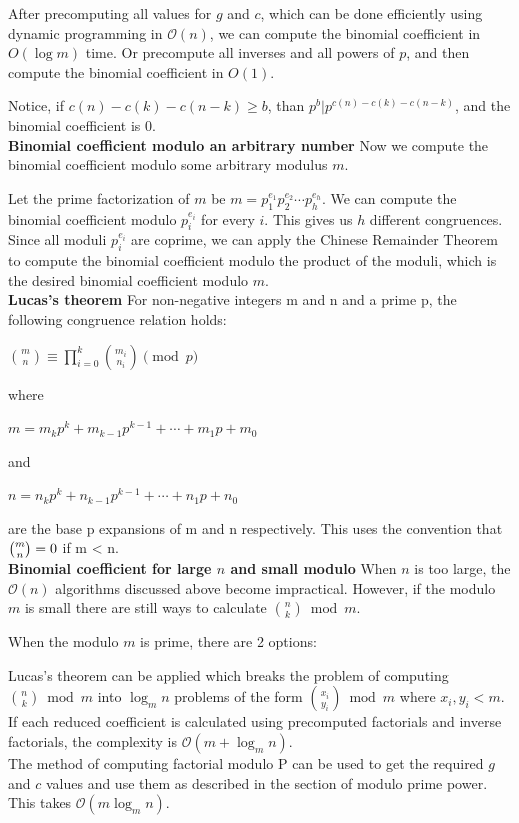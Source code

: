 \documentclass[8pt, a4paper, oneside, twocolumn]{extarticle}
\begin{document}
After precomputing all values for $g$ and $c$, which can be done efficiently using dynamic programming in $\mathcal{O}(n)$, we can compute the binomial coefficient in $O(\log m)$ time. Or precompute all inverses and all powers of $p$, and then compute the binomial coefficient in $O(1)$.

Notice, if $c(n) - c(k) - c(n-k) \ge b$, than $p^b | p^{c(n) - c(k) - c(n-k)}$, and the binomial coefficient is $0$.
\\\textbf{Binomial coefficient modulo an arbitrary number}
Now we compute the binomial coefficient modulo some arbitrary modulus $m$.

Let the prime factorization of $m$ be $m = p_1^{e_1} p_2^{e_2} \cdots p_h^{e_h}$. We can compute the binomial coefficient modulo $p_i^{e_i}$ for every $i$. This gives us $h$ different congruences. Since all moduli $p_i^{e_i}$ are coprime, we can apply the Chinese Remainder Theorem to compute the binomial coefficient modulo the product of the moduli, which is the desired binomial coefficient modulo $m$.
\\%
\textbf{Lucas's theorem}
For non-negative integers m and n and a prime p, the following congruence relation holds:

    ${\binom {m}{n}}\equiv \prod _{i=0}^{k}{\binom {m_{i}}{n_{i}}}{\pmod {p}}$

where

    $m=m_{k}p^{k}+m_{k-1}p^{k-1}+\cdots +m_{1}p+m_{0}$

and

    $n=n_{k}p^{k}+n_{k-1}p^{k-1}+\cdots +n_{1}p+n_{0}$ 

are the base p expansions of m and n respectively. This uses the convention that  ${\tbinom {m}{n}}=0$ if m < n. 
\\\textbf{Binomial coefficient for large $n$ and small modulo}
When $n$ is too large, the $\mathcal{O}(n)$ algorithms discussed above become impractical. However, if the modulo $m$ is small there are still ways to calculate $\binom{n}{k} \bmod m$.

When the modulo $m$ is prime, there are 2 options:

    Lucas's theorem can be applied which breaks the problem of computing $\binom{n}{k} \bmod m$ into $\log_m n$ problems of the form $\binom{x_i}{y_i} \bmod m$ where $x_i, y_i < m$. If each reduced coefficient is calculated using precomputed factorials and inverse factorials, the complexity is $\mathcal{O}(m + \log_m n)$.
    \\The method of computing factorial modulo P can be used to get the required $g$ and $c$ values and use them as described in the section of modulo prime power. This takes $\mathcal{O}(m \log_m n)$.
\end{document}
